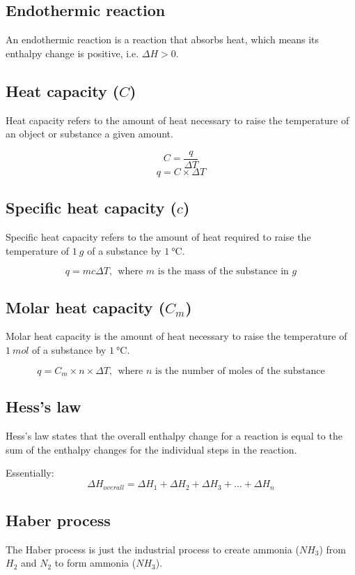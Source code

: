 \documentclass[11pt]{article}
\begin{document}
\subsection{Endothermic reaction}
\label{sec:orge4ca923}
An endothermic reaction is a reaction that absorbs heat, which means its enthalpy change is positive, i.e. \(\Delta H > 0\).
\subsection{Heat capacity (\(C\))}
\label{sec:org72199df}
Heat capacity refers to the amount of heat necessary to raise the temperature of an object or substance a given amount.

\[C = \frac{q}{\Delta T}\]
\[q = C \times \Delta T\]
\subsection{Specific heat capacity (\(c\))}
\label{sec:orgda875fd}
Specific heat capacity refers to the amount of heat required to raise the temperature of \(\qty{1}{\unit{g}}\) of a substance by \(\qty{1}{\unit{\degreeCelsius}}\).

\[q = mc \Delta T, \ \ \text{where } m \text{ is the mass of the substance in } \unit{g}\]
\subsection{Molar heat capacity (\(C_m\))}
\label{sec:org9f0b039}
Molar heat capacity is the amount of heat necessary to raise the temperature of \(\qty{1}{\unit{mol}}\) of a substance by \(\qty{1}{\unit{\degreeCelsius}}\).

\[q = C_m \times n \times \Delta T, \ \ \text{where } n \text{ is the number of moles of the substance}\]
\subsection{Hess's law}
\label{sec:org8344d06}
Hess's law states that the overall enthalpy change for a reaction is equal to the sum of the enthalpy changes for the individual steps in the reaction.


Essentially:
\[\Delta H_{overall} = \Delta H_{1} + \Delta H_{2} + \Delta H_{3} + \ldots + \Delta H_{n}\]

\newpage
\subsection{Haber process}
\label{sec:org54a1641}
The Haber process is just the industrial process to create ammonia (\(NH_3\)) from \(H_2\) and \(N_2\) to form ammonia (\(NH_3\)).
\end{document}

